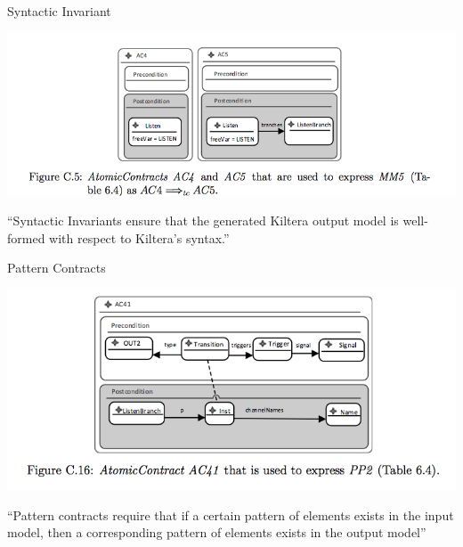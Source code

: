 \documentclass[xcolor=dvipsnames, 12pt]{beamer}
\begin{document}
\begin{frame}{Syntactic Invariant}
\begin{center}
\includegraphics[width=\textwidth]{figures/syn}
\end{center}
``Syntactic Invariants ensure that the generated Kiltera output model is well-formed with respect to Kiltera's syntax.''
\end{frame}

\begin{frame}{Pattern Contracts}
\begin{center}
\includegraphics[width=\textwidth]{figures/patt}
\end{center}
``Pattern contracts require that if a certain pattern of elements exists in the input
model, then a corresponding pattern of elements exists in the output model''
\end{frame}
\end{document}
